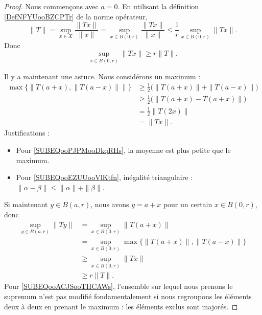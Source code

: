\begin{proof}
	Nous commençons avec \( a=0\). En utilisant la définition \ref{DefNFYUooBZCPTr} de la norme opérateur,
	\begin{equation}
		\| T \|=\sup_{x\in X}\frac{ \| Tx \| }{ \| x \| }=\sup_{x\in B(0,r)}\frac{ \| Tx \| }{ \| x \| }\leq \frac{1}{ r }\sup_{x\in B(0,r)}\| Tx \|.
	\end{equation}
	Donc
	\begin{equation}
		\sup_{x\in B(0,r)}\| Tx \|\geq r\| T \|.
	\end{equation}

	Il y a maintenant une astuce. Nous considérons un maximum :
	\begin{subequations}
		\begin{align}
			\max\{ \| T(a+x),\| T(a-x) \| \| \} & \geq \frac{ 1 }{2}\big( \| T(a+x) \|+\| T(a-x) \| \big) \label{SUBEQooPJPMooDkqRHs} \\
			                                    & \geq \frac{ 1 }{2}\big( \| T(a+x)-T(a+x) \| \big)      \label{SUBEQooEZUUooVlKtfn}  \\
			                                    & =\frac{ 1 }{2}\| T(2x) \|                                                           \\
			                                    & =\| Tx \|.
		\end{align}
	\end{subequations}
	Justifications :
	\begin{itemize}
		\item Pour \eqref{SUBEQooPJPMooDkqRHs}, la moyenne est plus petite que le maximum.
		\item Pour \eqref{SUBEQooEZUUooVlKtfn}, inégalité triangulaire : \( \| \alpha-\beta \|\leq \| \alpha \|+\| \beta \|\).
	\end{itemize}
	Si maintenant \( y\in B(a,r)\), nous avons \( y=a+x\) pour un certain \( x\in B(0,r)\), donc
	\begin{subequations}
		\begin{align}
			\sup_{y\in B(a,r)}\| Ty \| & =\sup_{x\in B(0,r)}\| T(a+x) \|                                                            \\
			                           & =\sup_{x\in B(0,r)}\max\{ \| T(a+x) \|, \| T(a-x) \| \}        \label{SUBEQooACJSooTHCAWs} \\
			                           & \geq \sup_{x\in B(0,r)}\| Tx \|                                                            \\
			                           & \geq r\| T \|.
		\end{align}
	\end{subequations}
	Pour \eqref{SUBEQooACJSooTHCAWs}, l'ensemble sur lequel nous prenons le supremum n'est pas modifié fondamentalement si nous regroupons les éléments deux à deux en prenant le maximum : les éléments exclus sont majorés.
\end{proof}

